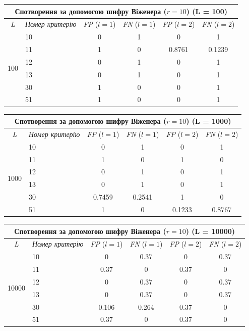 \documentclass[a4paper,12pt]{article}
\begin{document}
\begin{center}
\renewcommand{\arraystretch}{1.2}
\setlength{\tabcolsep}{6pt}
\begin{tabular}{|c|l||c|c||c|c|}
\hline
\multicolumn{6}{|c|}{Спотворення за допомогою шифру Віженера ($r = 10$) (L = 100)} \\
\hline
\textit{L} & \textit{Номер критерію} & \textit{FP} ($l=1$) & \textit{FN} ($l=1$) & \textit{FP} ($l=2$) & \textit{FN} ($l=2$) \\
\hline
\multirow{6}{*}{100} & 10 & 0 & 1 & 0 & 1 \\
 & 11 & 1 & 0 & 0.8761 & 0.1239 \\
 & 12 & 0 & 1 & 0 & 1 \\
 & 13 & 0 & 1 & 0 & 1 \\
 & 30 & 1 & 0 & 0 & 1 \\
 & 51 & 1 & 0 & 0 & 1 \\
\hline
\end{tabular}
\end{center}

\begin{center}
\renewcommand{\arraystretch}{1.2}
\setlength{\tabcolsep}{6pt}
\begin{tabular}{|c|l||c|c||c|c|}
\hline
\multicolumn{6}{|c|}{Спотворення за допомогою шифру Віженера ($r = 10$) (L = 1000)} \\
\hline
\textit{L} & \textit{Номер критерію} & \textit{FP} ($l=1$) & \textit{FN} ($l=1$) & \textit{FP} ($l=2$) & \textit{FN} ($l=2$) \\
\hline
\multirow{6}{*}{1000} & 10 & 0 & 1 & 0 & 1 \\
 & 11 & 1 & 0 & 1 & 0 \\
 & 12 & 0 & 1 & 0 & 1 \\
 & 13 & 0 & 1 & 0 & 1 \\
 & 30 & 0.7459 & 0.2541 & 1 & 0 \\
 & 51 & 1 & 0 & 0.1233 & 0.8767 \\
\hline
\end{tabular}
\end{center}

\begin{center}
\renewcommand{\arraystretch}{1.2}
\setlength{\tabcolsep}{6pt}
\begin{tabular}{|c|l||c|c||c|c|}
\hline
\multicolumn{6}{|c|}{Спотворення за допомогою шифру Віженера ($r = 10$) (L = 10000)} \\
\hline
\textit{L} & \textit{Номер критерію} & \textit{FP} ($l=1$) & \textit{FN} ($l=1$) & \textit{FP} ($l=2$) & \textit{FN} ($l=2$) \\
\hline
\multirow{6}{*}{10000} & 10 & 0 & 0.37 & 0 & 0.37 \\
 & 11 & 0.37 & 0 & 0.37 & 0 \\
 & 12 & 0 & 0.37 & 0 & 0.37 \\
 & 13 & 0 & 0.37 & 0 & 0.37 \\
 & 30 & 0.106 & 0.264 & 0.37 & 0 \\
 & 51 & 0.37 & 0 & 0.37 & 0 \\
\hline
\end{tabular}
\end{center}
\end{document}
